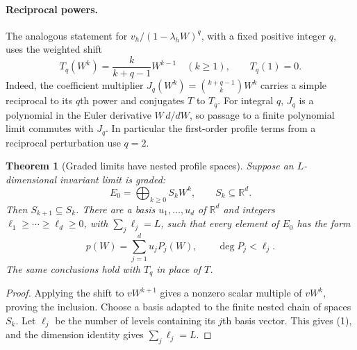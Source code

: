 \documentclass[11pt]{article}
\newtheorem{theorem}{Theorem}
\begin{document}
\paragraph{Reciprocal powers.}
The analogous statement for $v_h/(1-\lambda_hW)^q$, with a fixed positive
integer $q$, uses the weighted shift
\[
       T_q(W^k)=\frac{k}{k+q-1}W^{k-1}\quad(k\geq1),
       \qquad T_q(1)=0.
\]
Indeed, the coefficient multiplier
$J_q(W^k)=\binom{k+q-1}{k}W^k$ carries a simple reciprocal to its
$q$th power and conjugates $T$ to $T_q$. For integral $q$, $J_q$ is
a polynomial in the Euler derivative $W\,d/dW$, so passage to a
finite polynomial limit commutes with $J_q$. In particular the
first-order profile terms from a reciprocal perturbation use $q=2$.

\begin{theorem}[Graded limits have nested profile spaces]
Suppose an $L$-dimensional invariant limit is graded:
\[
                  E_0=\bigoplus_{k\geq0} S_k W^k,
                  \qquad S_k\subseteq\mathbb R^d.
\]
Then $S_{k+1}\subseteq S_k$. There are a basis $u_1,\ldots,u_d$ of
$\mathbb R^d$ and integers
$\ell_1\geq\cdots\geq\ell_d\geq0$, with $\sum_j\ell_j=L$, such that
every element of $E_0$ has the form
\[
                  p(W)=\sum_{j=1}^d u_j P_j(W),
                  \qquad \deg P_j<\ell_j.
                  \tag{1}
\]
The same conclusions hold with $T_q$ in place of $T$.
\end{theorem}
\begin{proof}
Applying the shift to $vW^{k+1}$ gives a nonzero scalar multiple of
$vW^k$, proving the inclusion. Choose a basis adapted to the finite
nested chain of spaces $S_k$. Let $\ell_j$ be the number of levels
containing its $j$th basis vector. This gives (1), and the dimension
identity gives $\sum_j\ell_j=L$.
\end{proof}
\end{document}
